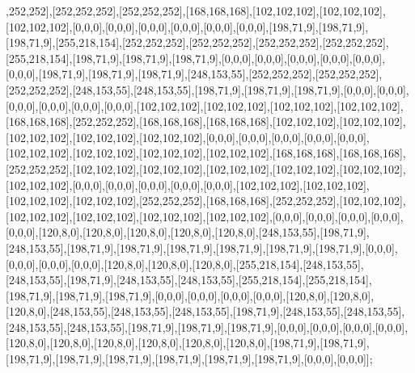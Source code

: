 ,252,252],[252,252,252],[252,252,252],[168,168,168],[102,102,102],[102,102,102],[102,102,102],[0,0,0],[0,0,0],[0,0,0],[0,0,0],[0,0,0],[0,0,0],[198,71,9],[198,71,9],[198,71,9],[255,218,154],[252,252,252],[252,252,252],[252,252,252],[252,252,252],[255,218,154],[198,71,9],[198,71,9],[198,71,9],[0,0,0],[0,0,0],[0,0,0],[0,0,0],[0,0,0],[0,0,0],[198,71,9],[198,71,9],[198,71,9],[248,153,55],[252,252,252],[252,252,252],[252,252,252],[248,153,55],[248,153,55],[198,71,9],[198,71,9],[198,71,9],[0,0,0],[0,0,0],[0,0,0],[0,0,0],[0,0,0],[0,0,0],[102,102,102],[102,102,102],[102,102,102],[102,102,102],[168,168,168],[252,252,252],[168,168,168],[168,168,168],[102,102,102],[102,102,102],[102,102,102],[102,102,102],[102,102,102],[0,0,0],[0,0,0],[0,0,0],[0,0,0],[0,0,0],[102,102,102],[102,102,102],[102,102,102],[102,102,102],[168,168,168],[168,168,168],[252,252,252],[102,102,102],[102,102,102],[102,102,102],[102,102,102],[102,102,102],[102,102,102],[0,0,0],[0,0,0],[0,0,0],[0,0,0],[0,0,0],[102,102,102],[102,102,102],[102,102,102],[102,102,102],[252,252,252],[168,168,168],[252,252,252],[102,102,102],[102,102,102],[102,102,102],[102,102,102],[102,102,102],[0,0,0],[0,0,0],[0,0,0],[0,0,0],[0,0,0],[120,8,0],[120,8,0],[120,8,0],[120,8,0],[120,8,0],[248,153,55],[198,71,9],[248,153,55],[198,71,9],[198,71,9],[198,71,9],[198,71,9],[198,71,9],[198,71,9],[0,0,0],[0,0,0],[0,0,0],[0,0,0],[120,8,0],[120,8,0],[120,8,0],[255,218,154],[248,153,55],[248,153,55],[198,71,9],[248,153,55],[248,153,55],[255,218,154],[255,218,154],[198,71,9],[198,71,9],[198,71,9],[0,0,0],[0,0,0],[0,0,0],[0,0,0],[120,8,0],[120,8,0],[120,8,0],[248,153,55],[248,153,55],[248,153,55],[198,71,9],[248,153,55],[248,153,55],[248,153,55],[248,153,55],[198,71,9],[198,71,9],[198,71,9],[0,0,0],[0,0,0],[0,0,0],[0,0,0],[120,8,0],[120,8,0],[120,8,0],[120,8,0],[120,8,0],[120,8,0],[198,71,9],[198,71,9],[198,71,9],[198,71,9],[198,71,9],[198,71,9],[198,71,9],[198,71,9],[0,0,0],[0,0,0]];
